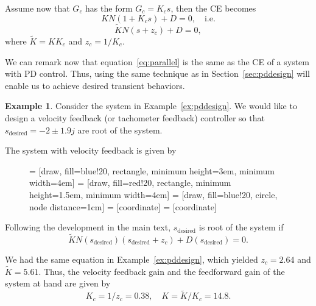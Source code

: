 \documentclass[a4paper,11pt]{report}
\theoremstyle{definition}
\newcommand{\des}{\textrm{desired}}
\newtheorem{mdexample}{Example}
\newenvironment{example}%
  {\vspace{0.1cm}\begin{mdframed}[backgroundcolor=lightgray]\begin{mdexample}}%
  {\end{mdexample}\end{mdframed}\vspace{0.1cm}}
\begin{document}
Assume now that $G_c$ has the form $G_c = K_cs$, then the CE becomes
\[
KN(1+K_cs) + D = 0,\quad\textrm{i.e.}
\]
\begin{equation}
  \label{eq:parallel}
  \tilde{K}N(s+z_c) + D =0,  
\end{equation}
where $\tilde{K}=KK_c$ and $z_c=1/K_c$.

We can remark now that equation~\ref{eq:parallel} is the same as the
CE of a system with PD control. Thus, using the same technique as in
Section~\ref{sec:pddesign} will enable us to achieve desired transient
behaviors.

\begin{example}
  \label{ex:paralleldesign}
  Consider the system in Example~\ref{ex:pddesign}. We would like to
  design a velocity feedback (or tachometer feedback) controller so
  that $s_\des=-2\pm1.9j$ are root of the system.

  The system with velocity feedback is given by

  \begin{figure}[H]
    \centering
     = [draw, fill=blue!20, rectangle, minimum height=3em, minimum width=4em]
     = [draw, fill=red!20, rectangle, minimum height=1.5em, minimum width=4em]
     = [draw, fill=blue!20, circle, node distance=1cm]
     = [coordinate]
     = [coordinate]
  \end{figure}

  Following the development in the main text, $s_\des$ is root of
  the system if
  \[
  \tilde{K}N(s_\des)(s_\des+z_c) + D(s_\des) =0.
  \]

  We had the same equation in Example~\ref{ex:pddesign}, which yielded
  $z_c=2.64$ and $\tilde{K}=5.61$. Thus, the velocity feedback gain
  and the feedforward gain of the system at hand are given by
  \[
  K_c = 1/z_c = 0.38,\quad K = \tilde{K}/K_c = 14.8.
  \]

\end{example}
\end{document}
